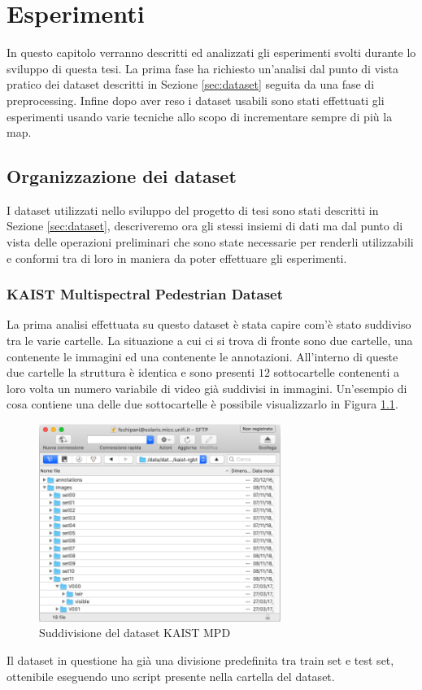 \chapter{Esperimenti}
\label{chap:experiment}
In questo capitolo verranno descritti ed analizzati gli esperimenti svolti durante lo sviluppo di questa tesi. La prima fase ha richiesto un'analisi dal punto di vista pratico dei dataset descritti in Sezione \ref{sec:dataset} seguita da una fase di preprocessing. 
Infine dopo aver reso i dataset usabili sono stati effettuati gli esperimenti usando varie tecniche allo scopo di incrementare sempre di più la \acl{map}. 
\section{Organizzazione dei dataset}
\label{sec:dataset_org}
I dataset utilizzati nello sviluppo del progetto di tesi sono stati descritti in Sezione \ref{sec:dataset}, descriveremo ora gli stessi insiemi di dati ma dal punto di vista delle operazioni preliminari che sono state necessarie per renderli utilizzabili e conformi tra di loro in maniera da poter effettuare gli esperimenti. 
\subsection{KAIST Multispectral Pedestrian Dataset}
\label{subsec:kaist_experiment}
La prima analisi effettuata su questo dataset è stata capire com'è stato suddiviso tra le varie cartelle. La situazione a cui ci si trova di fronte sono due cartelle, una contenente le immagini ed una contenente le annotazioni. All'interno di queste due cartelle la struttura è identica e sono presenti $12$ sottocartelle contenenti a loro volta un numero variabile di video già suddivisi in immagini. Un'esempio di cosa contiene una delle due sottocartelle è possibile visualizzarlo in Figura \ref{fig:kaist_dataset_folder}.
\begin{figure}
    \centering
    \includegraphics[width=0.7\textwidth]{images/screen_kaist.png}
    \caption{Suddivisione del dataset KAIST MPD}
    \label{fig:kaist_dataset_folder}
\end{figure} 
Il dataset in questione ha già una divisione predefinita tra train set e test set, ottenibile eseguendo uno script presente nella cartella del dataset. 

